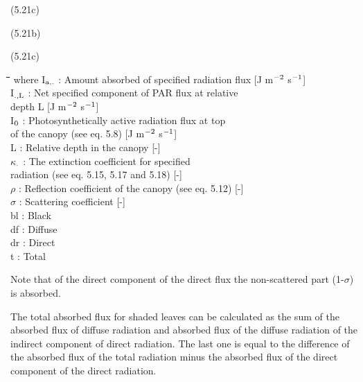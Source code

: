  
\strut\hfill (5.21c)

\strut\hfill (5.21b)

\strut\hfill (5.21c)


\nwln
\begin{tabbing}
\hspace{1.27cm}\=\hspace{1.27cm}\=\hspace{1.27cm}\=\hspace{1.27cm}\=%
\hspace{1.27cm}\=\hspace{1.27cm}\=\hspace{1.27cm}\=\hspace{1.27cm}\=%
\hspace{1.27cm}\=\hspace{1.27cm}\=\kill
where I$_{{\rm a,.}}$ : Amount absorbed of specified radiation flux         [J m$^{{\rm -2}}$ s$^{{\rm -1}}$]\\
I$_{{\rm .,L}}$ : Net specified component of PAR flux at relative \\
   depth L        [J m$^{{\rm -2}}$ s$^{{\rm -1}}$]\\
I$_{{\rm 0}}$ : Photosynthetically active radia\-tion flux at top\\
   of the canopy (see eq. 5.8)        [J m$^{{\rm -2}}$ s$^{{\rm -1}}$]\\
L : Relative depth in the canopy        [-]\\
$\kappa$$_{{\rm .}}$ : The extinction coefficient for specified\\
   radiation (see eq. 5.15, 5.17 and 5.18)        [-]\\
$\rho$ : Reflection coefficient of the canopy (see eq. 5.12)        [-]\\
$\sigma$ : Scattering coefficient        [-]\\
bl : Black\\
df : Diffuse\\
dr : Direct\\
t : Total
\end{tabbing}


Note that of the direct component of the direct flux the non-scattered part (1-$\sigma$) is
absorbed.



The total absorbed flux for shaded leaves can be calculated as the sum of the absorbed
flux of diffuse radiation and absorbed flux of the diffuse radiation of the indirect
component of direct radiation. The last one is equal to the difference of the absorbed flux
of the total radiation minus the absorbed flux of the direct component of the direct
radiation.

